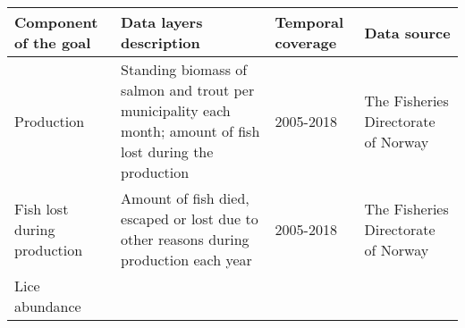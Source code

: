 \documentclass[
]{book}
\begin{document}
\begin{longtable}[]{@{}llll@{}}
\toprule
\begin{minipage}[b]{0.23\columnwidth}\raggedright
Component of the goal\strut
\end{minipage} & \begin{minipage}[b]{0.22\columnwidth}\raggedright
Data layers description\strut
\end{minipage} & \begin{minipage}[b]{0.25\columnwidth}\raggedright
Temporal coverage\strut
\end{minipage} & \begin{minipage}[b]{0.18\columnwidth}\raggedright
Data source\strut
\end{minipage}\tabularnewline
\midrule
\endhead
\begin{minipage}[t]{0.23\columnwidth}\raggedright
Production\strut
\end{minipage} & \begin{minipage}[t]{0.22\columnwidth}\raggedright
Standing biomass of salmon and trout per municipality each month; amount of fish lost during the production\strut
\end{minipage} & \begin{minipage}[t]{0.25\columnwidth}\raggedright
2005-2018\strut
\end{minipage} & \begin{minipage}[t]{0.18\columnwidth}\raggedright
The Fisheries Directorate of Norway\strut
\end{minipage}\tabularnewline
\begin{minipage}[t]{0.23\columnwidth}\raggedright
Fish lost during production\strut
\end{minipage} & \begin{minipage}[t]{0.22\columnwidth}\raggedright
Amount of fish died, escaped or lost due to other reasons during production each year\strut
\end{minipage} & \begin{minipage}[t]{0.25\columnwidth}\raggedright
2005-2018\strut
\end{minipage} & \begin{minipage}[t]{0.18\columnwidth}\raggedright
The Fisheries Directorate of Norway\strut
\end{minipage}\tabularnewline
\begin{minipage}[t]{0.23\columnwidth}\raggedright
Lice abundance\strut
\end{minipage} & \begin{minipage}[t]{0.22\columnwidth}\raggedright

\end{minipage}
\end{longtable}
\end{document}
